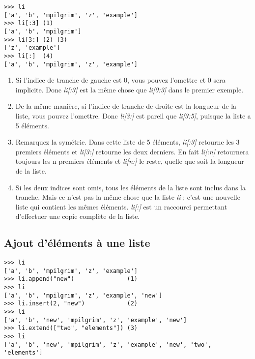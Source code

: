 \begin{example}
\begin{lstlisting}
>>> li
['a', 'b', 'mpilgrim', 'z', 'example']
>>> li[:3] (1)
['a', 'b', 'mpilgrim']
>>> li[3:] (2) (3)
['z', 'example']
>>> li[:]  (4)
['a', 'b', 'mpilgrim', 'z', 'example']
\end{lstlisting}
\end{example}

\begin{enumerate}
\item{Si l'indice de tranche de gauche est 0, vous pouvez l'omettre et 0 sera implicite. Donc \emph{li[:3]} est la même chose que \emph{li[0:3]} dans le premier exemple.}
\item{De la même manière, si l'indice de tranche de droite est la longueur de la liste, vous pouvez l'omettre. Donc \emph{li[3:]} est pareil que \emph{li[3:5]}, puisque la liste a 5 éléments.}
\item{Remarquez la symétrie. Dans cette liste de 5 éléments, \emph{li[:3]} retourne les 3 premiers éléments et \emph{li[3:]} retourne les deux derniers. En fait \emph{li[:n]} retournera toujours les n premiers éléments et \emph{li[n:]} le reste, quelle que soit la longueur de la liste.}
\item{Si les deux indices sont omis, tous les éléments de la liste sont inclus dans la tranche. Mais ce n'est pas la même chose que la liste \emph{li} ; c'est une nouvelle liste qui contient les mêmes éléments. \emph{li[:]} est un raccourci permettant d'effectuer une copie complète de la liste.}
\end{enumerate}

\subsection{Ajout d'éléments à une liste}

\begin{example}
\begin{lstlisting}
>>> li
['a', 'b', 'mpilgrim', 'z', 'example']
>>> li.append("new")               (1)
>>> li
['a', 'b', 'mpilgrim', 'z', 'example', 'new']
>>> li.insert(2, "new")            (2)
>>> li
['a', 'b', 'new', 'mpilgrim', 'z', 'example', 'new']
>>> li.extend(["two", "elements"]) (3)
>>> li
['a', 'b', 'new', 'mpilgrim', 'z', 'example', 'new', 'two', 'elements']
\end{lstlisting}
\end{example}

